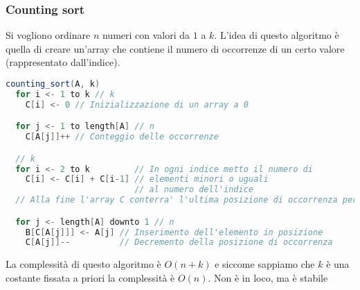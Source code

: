\documentclass[a4paper]{article}
\begin{document}
\subsubsection{Counting sort}
Si vogliono ordinare \( n \) numeri con valori da \( 1 \) a \( k \). L'idea di questo
algoritmo è quella di creare un'array che contiene il numero di occorrenze di un
certo valore (rappresentato dall'indice).

\begin{lstlisting}[language=Scala]
counting_sort(A, k) 
  for i <- 1 to k // k
    C[i] <- 0 // Inizializzazione di un array a 0

  for j <- 1 to length[A] // n
    C[A[j]]++ // Conteggio delle occorrenze

  // k
  for i <- 2 to k         // In ogni indice metto il numero di
    C[i] <- C[i] + C[i-1] // elementi minori o uguali
                          // al numero dell'indice
  // Alla fine l'array C conterra' l'ultima posizione di occorrenza per ogni elemento

  for j <- length[A] downto 1 // n
    B[C[A[j]]] <- A[j] // Inserimento dell'elemento in posizione
    C[A[j]]--          // Decremento della posizione di occorrenza
\end{lstlisting}
La complessità di questo algoritmo è \( O(n + k) \) e siccome sappiamo che \( k \) è
una costante fissata a priori la complessità è \( O(n) \). Non è in loco, ma è stabile
\end{document}
